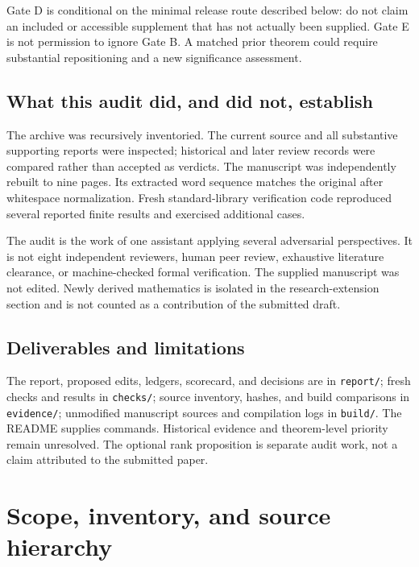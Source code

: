 \documentclass[
  11pt,
]{article}
\begin{document}
Gate D is conditional on the minimal release route described below: do
not claim an included or accessible supplement that has not actually
been supplied. Gate E is not permission to ignore Gate B. A matched
prior theorem could require substantial repositioning and a new
significance assessment.

\subsection{What this audit did, and did not,
establish}\label{what-this-audit-did-and-did-not-establish}

The archive was recursively inventoried. The current source and all
substantive supporting reports were inspected; historical and later
review records were compared rather than accepted as verdicts. The
manuscript was independently rebuilt to nine pages. Its extracted word
sequence matches the original after whitespace normalization. Fresh
standard-library verification code reproduced several reported finite
results and exercised additional cases.

The audit is the work of one assistant applying several adversarial
perspectives. It is not eight independent reviewers, human peer review,
exhaustive literature clearance, or machine-checked formal verification.
The supplied manuscript was not edited. Newly derived mathematics is
isolated in the research-extension section and is not counted as a
contribution of the submitted draft.

\subsection{Deliverables and
limitations}\label{deliverables-and-limitations}

The report, proposed edits, ledgers, scorecard, and decisions are in
\nolinkurl{report/}; fresh checks and results in \nolinkurl{checks/};
source inventory, hashes, and build comparisons in
\nolinkurl{evidence/}; unmodified manuscript sources and compilation
logs in \nolinkurl{build/}. The README supplies commands. Historical
evidence and theorem-level priority remain unresolved. The optional rank
proposition is separate audit work, not a claim attributed to the
submitted paper.

\newpage
\tableofcontents
\newpage

\section{Scope, inventory, and source
hierarchy}\label{scope-inventory-and-source-hierarchy}
\end{document}
